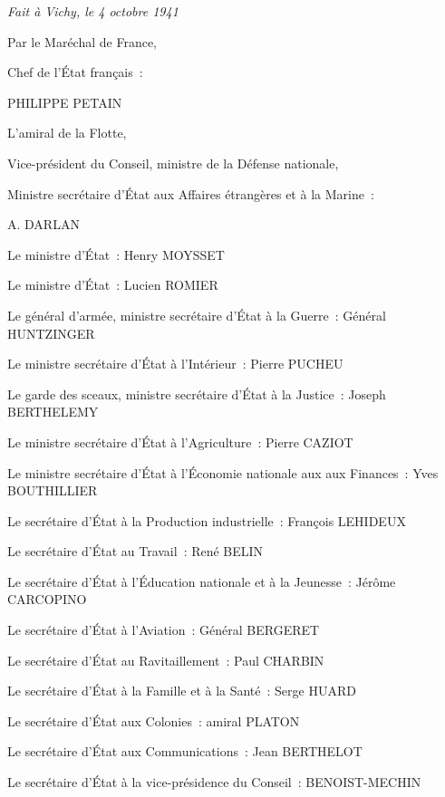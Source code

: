\documentclass[french,twoside]{book} %
\newif\ifdev
\renewcommand{\LettrineFontHook}{\color{rubric}}
\newcommand{\initialiv}[2]{%
  \let\oldLFH\LettrineFontHook
  \IfSubStr{QJ’}{#1}{
    \lettrine[lines=4, lhang=0.2, loversize=-0.1, lraise=0.2]{\smash{#1}}{#2}
  }{\IfSubStr{É}{#1}{
    \lettrine[lines=4, lhang=0.2, loversize=-0, lraise=0]{\smash{#1}}{#2}
  }{\IfSubStr{ÀÂ}{#1}{
    \lettrine[lines=4, lhang=0.2, loversize=-0, lraise=0, slope=0.6em]{\smash{#1}}{#2}
  }{\IfSubStr{A}{#1}{
    \lettrine[lines=4, lhang=0.2, loversize=0.2, slope=0.6em]{\smash{#1}}{#2}
  }{\IfSubStr{V}{#1}{
    \lettrine[lines=4, lhang=0.2, loversize=0.2, slope=-0.5em]{\smash{#1}}{#2}
  }{
    \lettrine[lines=4, lhang=0.2, loversize=0.2]{\smash{#1}}{#2}
  }}}}}
  \let\LettrineFontHook\oldLFH
}
\renewcommand{\LettrineFontHook}{\bfseries\color{rubric}}
\begin{document}
\noindent \emph{Fait à Vichy, le 4 octobre 1941}\par
Par le Maréchal de France,\par
Chef de l’État français :\par
PHILIPPE PETAIN\par
L’amiral de la Flotte,\par
Vice-président du Conseil, ministre de la Défense nationale,\par
Ministre secrétaire d’État aux Affaires étrangères et à la Marine :\par
A. DARLAN\par
Le ministre d’État : Henry MOYSSET\par
Le ministre d’État : Lucien ROMIER\par
Le général d’armée, ministre secrétaire d’État à la Guerre : Général HUNTZINGER\par
Le ministre secrétaire d’État à l’Intérieur : Pierre PUCHEU\par
Le garde des sceaux, ministre secrétaire d’État à la Justice : Joseph BERTHELEMY\par
Le ministre secrétaire d’État à l’Agriculture : Pierre CAZIOT\par
Le ministre secrétaire d’État à l’Économie nationale aux aux Finances : Yves BOUTHILLIER\par
Le secrétaire d’État à la Production industrielle : François LEHIDEUX\par
Le secrétaire d’État au Travail : René BELIN\par
Le secrétaire d’État à l’Éducation nationale et à la Jeunesse : Jérôme CARCOPINO\par
Le secrétaire d’État à l’Aviation : Général BERGERET\par
Le secrétaire d’État au Ravitaillement : Paul CHARBIN\par
Le secrétaire d’État à la Famille et à la Santé : Serge HUARD\par
Le secrétaire d’État aux Colonies : amiral PLATON\par
Le secrétaire d’État aux Communications : Jean BERTHELOT\par
Le secrétaire d’État à la vice-présidence du Conseil : BENOIST-MECHIN
 


\ifbooklet
  \newpage\null\thispagestyle{empty}\newpage
\fi

\ifdev %
\fontname\font — \textsc{Les règles du jeu}\par
(\hyperref[utopie]{\underline{Lien}})\par
\noindent \initialiv{A}{lors là}\blindtext\par
\noindent \initialiv{À}{ la bonheur des dames}\blindtext\par
\noindent \initialiv{É}{tonnez-le}\blindtext\par
\noindent \initialiv{Q}{ualitativement}\blindtext\par
\noindent \initialiv{V}{aloriser}\blindtext\par
\Blindtext
\phantomsection
\label{utopie}
\Blinddocument
\fi
\end{document}
